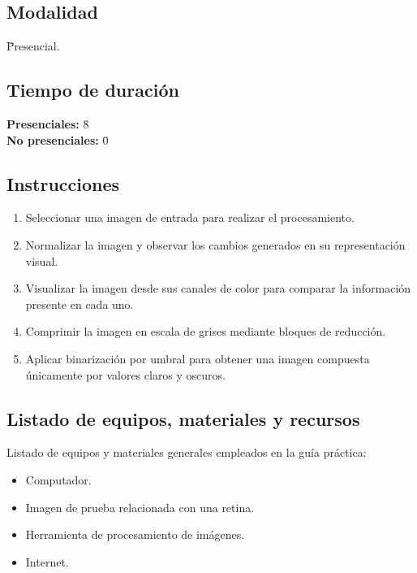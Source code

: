 \documentclass[11pt]{article}
\begin{document}
\subsection{Modalidad}
\begin{tabbing}
    \hspace{1cm} \= Presencial.
\end{tabbing}

\subsection{Tiempo de duración}
\begin{tabbing}
    \hspace{1cm} \= \textbf{Presenciales:} \= 8 \\
    \hspace{1cm} \= \textbf{No presenciales:} \= 0
\end{tabbing}

\subsection{Instrucciones}
\begin{enumerate}
    \item Seleccionar una imagen de entrada para realizar el procesamiento.
    \item Normalizar la imagen y observar los cambios generados en su representación visual.
    \item Visualizar la imagen desde sus canales de color para comparar la información presente en cada uno.
    \item Comprimir la imagen en escala de grises mediante bloques de reducción.
    \item Aplicar binarización por umbral para obtener una imagen compuesta únicamente por valores claros y oscuros.
\end{enumerate}

\subsection{Listado de equipos, materiales y recursos}
Listado de equipos y materiales generales empleados en la guía práctica:
\begin{itemize}
    \item Computador.
    \item Imagen de prueba relacionada con una retina.
    \item Herramienta de procesamiento de imágenes.
    \item Internet.
\end{itemize}
\end{document}
